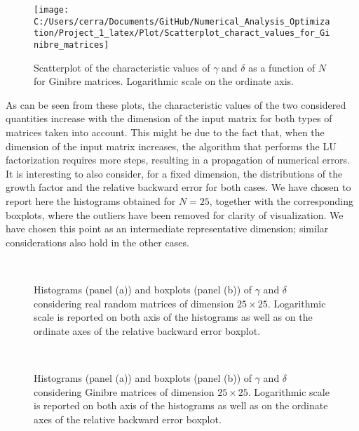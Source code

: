 \documentclass[a4paper,11pt]{article}
\begin{document}
\begin{figure}[H]
	\centering
	\texttt{[image: C:/Users/cerra/Documents/GitHub/Numerical\_Analysis\_Optimization/Project\_1\_latex/Plot/Scatterplot\_charact\_values\_for\_Ginibre\_matrices]}
	\caption{Scatterplot of the characteristic values of $\gamma$ and $\delta$ as a function of $N$ for Ginibre matrices. Logarithmic scale on the ordinate axis.}
	\label{fig:Scatterplot_Ginibre}
\end{figure}
	
\noindent As can be seen from these plots, the characteristic values of the two considered quantities increase with the dimension of the input matrix for both types of matrices taken into account. This might be due to the fact that, when the dimension of the input matrix increases, the algorithm that performs the LU factorization requires more steps, resulting in a propagation of numerical errors. It is interesting to also consider, for a fixed dimension, the distributions of the growth factor and the relative backward error for both cases. We have chosen to report here the histograms obtained for $N=25$, together with the corresponding boxplots, where the outliers have been removed for clarity of visualization. We have chosen this point as an intermediate representative dimension; similar considerations also hold in the other cases.
\begin{figure}[H]
	\centering
	\ 
	\caption{Histograms (panel (a)) and boxplots (panel (b)) of $\gamma$ and $\delta$ considering real random matrices of dimension $25\times 25$. Logarithmic scale is reported on both axis of the histograms as well as on the ordinate axes of the relative backward error boxplot.}
	\label{fig:Distributions and boxplot Random Matrices N=25}
\end{figure}

\begin{figure}[H]
	\centering
	\ 
	\caption{Histograms (panel (a)) and boxplots (panel (b)) of $\gamma$ and $\delta$ considering Ginibre matrices of dimension $25\times 25$. Logarithmic scale is reported on both axis of the histograms as well as on the ordinate axes of the relative backward error boxplot.}
	\label{fig:Distributions and boxplot Ginibre Matrices N=25}
\end{figure}
\end{document}

